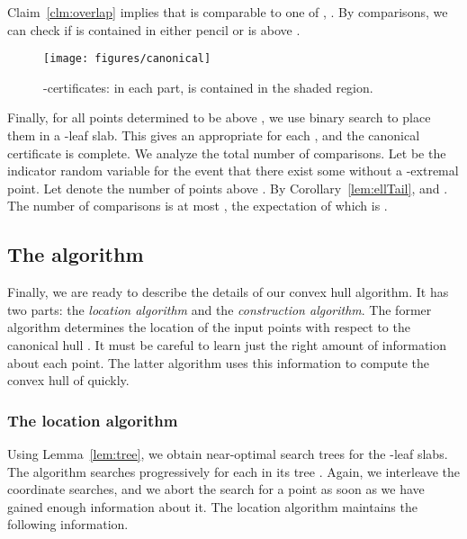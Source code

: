 \documentclass[letterpaper,11pt]{article}
\begin{document}
Claim~\ref{clm:overlap} implies that
 is comparable to one of 
, .
By  comparisons, we can check 
if  is contained in either 
pencil or is above .
\begin{figure}
  \centering
  \texttt{[image: figures/canonical]}
  \caption{-certificates: in each part, 
    is contained in the shaded region.}
  \label{fig:canonical}
\end{figure}
Finally, for all points determined 
to be above , we use binary search
to place them in a -leaf slab. This 
gives an appropriate  for each 
, and the canonical certificate 
is complete.
We analyze the total number of comparisons.
Let  be the indicator random variable 
for the event that there exist some 
 without a -extremal 
point. Let  denote the number of 
points above . By 
Corollary~\ref{lem:ellTail}, 
and . 
The number of comparisons is at most 
,
the expectation of which is .

\subsection{The algorithm}

Finally, we are ready to 
describe the details of our convex 
hull algorithm. It has two parts: 
the \emph{location algorithm} and the 
\emph{construction algorithm}. The 
former algorithm determines the location 
of the input points with respect to the 
canonical hull . It must be careful 
to learn just the right amount of information 
about each point. The latter algorithm uses 
this information to compute the convex
hull of  quickly.

\subsubsection{The location algorithm}
\label{sec:loc_alg}
Using Lemma~\ref{lem:tree},
we obtain near-optimal search trees 
 for the -leaf slabs. 
The algorithm searches progressively 
for each  in its 
tree . Again, we interleave the
coordinate searches, and we abort the
search for a point as soon as we have 
gained enough information about
it. The location algorithm maintains 
the following information. 
\end{document}
